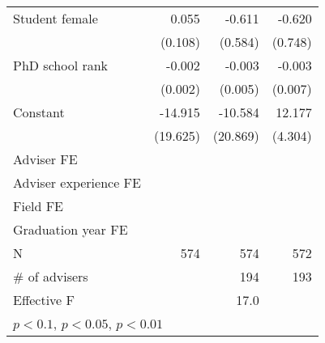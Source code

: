 {\begin{tabular}{l*{3}{D{.}{.}{-1}}}
\addlinespace
Student female                	&          0.055         	&         -0.611         	&         -0.620         \\
                              	&        (0.108)         	&        (0.584)         	&        (0.748)         \\
\addlinespace
PhD school rank               	&         -0.002         	&         -0.003         	&         -0.003         \\
                              	&        (0.002)         	&        (0.005)         	&        (0.007)         \\
\addlinespace
Constant                      	&        -14.915         	&        -10.584         	&         12.177\sym{***}\\
                              	&       (19.625)         	&       (20.869)         	&        (4.304)         \\
\addlinespace
Adviser FE                    	&     \checkmark         	&     \checkmark         	&     \checkmark         \\
\addlinespace
Adviser experience FE         	&     \checkmark         	&     \checkmark         	&     \checkmark         \\
\addlinespace
Field FE                      	&     \checkmark         	&     \checkmark         	&     \checkmark         \\
\addlinespace
Graduation year FE            	&     \checkmark         	&     \checkmark         	&     \checkmark         \\
\midrule
N                             	&            574         	&            574         	&            572         \\
\# of advisers                	&                        	&            194         	&            193         \\
Effective F                   	&                        	&           17.0         	&                        \\
\bottomrule
{}\\
\end{tabular}
}
